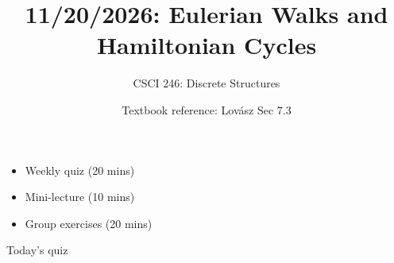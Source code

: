 \documentclass[10pt]{beamer}
\begin{document}
\title{11/20/2026: Eulerian Walks and Hamiltonian Cycles}
\author{CSCI 246: Discrete Structures}
\date{Textbook reference: Lovász Sec 7.3}

\begin{frame}
    \titlepage 
\end{frame}


\begin{frame}
%
\begin{myyellowbox}[title=Today's Agenda]
\begin{itemize}
	\item Weekly quiz (20 mins)
	\item Mini-lecture (10 mins) 
	\item Group exercises (20 mins)
\end{itemize}


\end{myyellowbox}
\vfill 

\end{frame}



\begin{frame}[standout]
Today's quiz
\end{frame}
\end{document}

